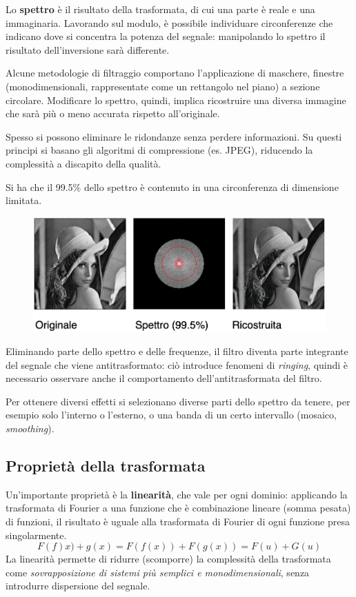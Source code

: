 Lo \textbf{spettro} è il risultato della trasformata, di cui una parte è reale e una immaginaria. Lavorando sul modulo, è possibile individuare circonferenze che indicano dove si concentra la potenza del segnale: manipolando lo spettro il risultato dell'inversione sarà differente. 

Alcune metodologie di filtraggio comportano l'applicazione di maschere, finestre (monodimensionali, rappresentate come un rettangolo nel piano) a sezione circolare. Modificare lo spettro, quindi, implica ricostruire una diversa immagine che sarà più o meno accurata rispetto all'originale. 

Spesso si possono eliminare le ridondanze senza perdere informazioni. Su questi principi si basano gli algoritmi di compressione (es. JPEG), riducendo la complessità a discapito della qualità.

Si ha che il 99.5\% dello spettro è contenuto in una circonferenza di dimensione limitata.
\begin{figure}[h]
	\centering
	\includegraphics[scale=0.45]{Lezioni/Immagini/spettro}
\end{figure}

Eliminando parte dello spettro e delle frequenze, il filtro diventa parte integrante del segnale che viene antitrasformato: ciò introduce fenomeni di \textit{ringing}, quindi è necessario osservare anche il comportamento dell'antitrasformata del filtro. 

Per ottenere diversi effetti si selezionano diverse parti dello spettro da tenere, per esempio solo l'interno o l'esterno, o una banda di un certo intervallo (mosaico, \textit{smoothing}). 

\subsection{Proprietà della trasformata}
Un'importante proprietà è la \textbf{linearità}, che vale per ogni dominio: applicando la trasformata di Fourier a una funzione che è combinazione lineare (somma pesata) di funzioni, il risultato è uguale alla trasformata di Fourier di ogni funzione presa singolarmente. 
$$F(f)x) + g(x) = F(f(x)) + F(g(x)) = F(u) + G(u)$$
La linearità permette di ridurre (scomporre) la complessità della trasformata come \textit{sovrapposizione di sistemi più semplici e monodimensionali}, senza introdurre dispersione del segnale.

